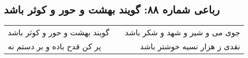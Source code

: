 \begin{center}
\section*{رباعی شماره ۸۸: گویند بهشت و حور و کوثر باشد}
\label{sec:sh088}
\begin{longtable}{l p{0.5cm} r}
گویند بهشت و حور و کوثر باشد
&&
جوی می و شیر و شهد و شکر باشد
\\
پر کن قدح باده و بر دستم نه
&&
نقدی ز هزار نسیه خوشتر باشد
\\
\end{longtable}
\end{center}
